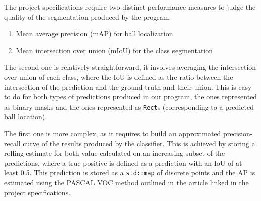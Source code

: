 The project specifications require two distinct performance 
measures to judge the quality of the segmentation produced 
by the program:

\begin{enumerate}
    \item Mean average precision (mAP) for ball localization
    \item Mean intersection over union (mIoU) for the class segmentation
\end{enumerate}

The second one is relatively straightforward, it involves 
averaging the intersection over union of each class, where 
the IoU is defined as the ratio between the intersection 
of the prediction and the ground truth and their union.
This is easy to do for both types of predictions produced in 
our program, the ones represented as binary masks and the 
ones represented as \verb|Rect|s (corresponding to a predicted 
ball location).

The first one is more complex, as it requires to build an 
approximated precision-recall curve of the results produced 
by the classifier. This is achieved by storing a rolling 
estimate for both value calculated on an increasing subset 
of the predictions, where a true positive is defined as 
a prediction with an IoU of at least 0.5.
This prediction is stored as a \verb|std::map| of discrete 
points and the AP is estimated using the PASCAL VOC method 
outlined in the article linked in the project specifications.